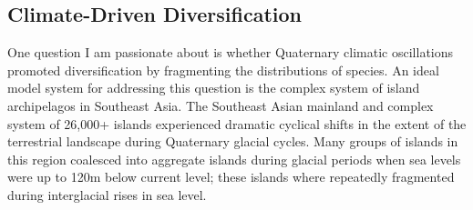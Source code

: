
\subsection*{Climate-Driven Diversification}
One question I am passionate about is whether Quaternary climatic oscillations
promoted diversification by fragmenting the distributions of species.
An ideal model system for addressing this question is the complex system of
island archipelagos in Southeast Asia.
The Southeast Asian mainland and complex system of 26,000+ islands experienced
dramatic cyclical shifts in the extent of the terrestrial landscape during
Quaternary glacial cycles.
Many groups of islands in this region coalesced into aggregate islands during
glacial periods when sea levels were up to 120m below current level; these
islands where repeatedly fragmented during interglacial rises in sea level.


